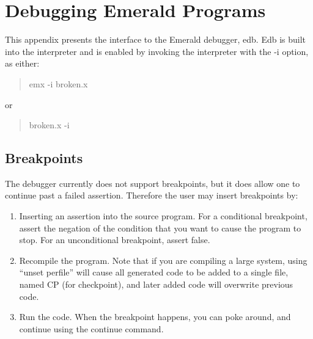 \section{Debugging Emerald Programs}
\label{debugger appendix}

This appendix presents the interface to the Emerald debugger, edb.  Edb is
built into the interpreter and is enabled by invoking the interpreter with
the -i option, as either:
\begin{quote}
  emx -i broken.x
\end{quote}
or
\begin{quote}
  broken.x -i
\end{quote}

\subsection{Breakpoints}
The debugger currently does not support breakpoints, but it does allow one
to continue past a failed assertion.  Therefore the user may insert
breakpoints by:
\begin{enumerate}
  \item{} Inserting an assertion into the source program.  For a conditional
    breakpoint, assert the negation of the condition that you want to cause
    the program to stop.  For an unconditional breakpoint, assert false.
  \item{} Recompile the program.  Note that if you are compiling a large
    system, using ``unset perfile'' will cause all generated code to be
    added to a single file, named CP (for checkpoint), and later added code
    will overwrite previous code.
  \item{} Run the code.  When the breakpoint happens, you can poke around,
    and continue using the continue command.
\end{enumerate}

